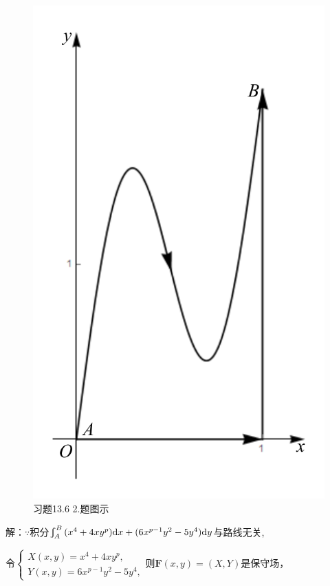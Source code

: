 \documentclass[12pt,UTF8]{ctexart}
\newcommand{\md}[1]{\mathrm d#1}
\begin{document}
\begin{enumerate}
\begin{figure}[H]
\begin{center}
\includegraphics[height=0.5\textheight]{Figures25/Fig13-6-2.pdf}
\end{center}
\caption{习题13.6 2.题图示}
\label{13-6-2}
\end{figure}

解：$\because$积分$\varint_A^B{(x^4+4xy^p)\md x+(6x^{p-1}y^2-5y^4)\md y}$与路线无关,

令$\begin{cases}
X(x,y)=x^4+4xy^p,\\
Y(x,y)=6x^{p-1}y^2-5y^4,
\end{cases}$则$\bm F(x,y)=(X,Y)$是保守场，


\end{enumerate}
\end{document}
